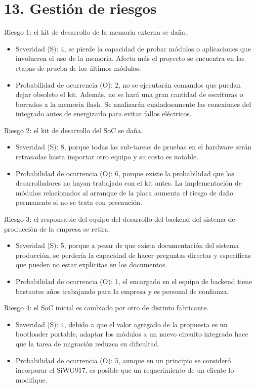 \documentclass[
11pt, %
]{charter}
\begin{document}
\section{13. Gestión de riesgos}
\label{sec:riesgos}

Riesgo 1: el kit de desarrollo de la memoria externa se daña.
\begin{itemize}
	\item Severidad (S): 4, se pierde la capacidad de probar módulos o aplicaciones que involucren el uso de la memoria. Afecta más el proyecto se encuentra
	en las etapas de prueba de los últimos módulos.
	\item Probabilidad de ocurrencia (O): 2, no se ejecutarán comandos que puedan dejar obsoleto el kit. Además, no se hará una gran cantidad de escrituras o borrados a la memoria flash. Se analizarán cuidadosamente las conexiones del integrado antes de energizarlo para evitar fallos eléctricos.
\end{itemize}   

Riesgo 2: el kit de desarrollo del SoC se daña.
\begin{itemize}
	\item Severidad (S): 8, porque todas las sub-tareas de pruebas en el hardware serán retrasadas hasta importar otro equipo y su costo es notable.
	\item Probabilidad de ocurrencia (O): 6, porque existe la probabilidad que los desarrolladores no hayan trabajado con el kit antes. La implementación de módulos relacionados al arranque de la placa aumenta el riesgo de daño permanente si no se trata con precaución.
\end{itemize}

Riesgo 3: el responsable del equipo del desarrollo del backend del sistema de producción de la empresa se retira.
\begin{itemize}
	\item Severidad (S): 5, porque a pesar de que exista documentación del sistema producción, se perdería la capacidad de hacer preguntas directas y específicas que pueden no estar explicitas en los documentos.
	\item Probabilidad de ocurrencia (O): 1, el encargado en el equipo de backend tiene bastantes años trabajando para la empresa y es personal de confianza.
\end{itemize}

Riesgo 4: el SoC inicial es cambiado por otro de distinto fabricante.
\begin{itemize}
	\item Severidad (S): 4, debido a que el valor agregado de la propuesta es un bootloader portable, adaptar los módulos a un nuevo circuito integrado hace que la tarea de migración reduzca su dificultad.
	\item Probabilidad de ocurrencia (O): 5, aunque en un principio se consideró incorporar el SiWG917, es posible que un requerimiento de un cliente lo modifique.
\end{itemize}
\end{document}
